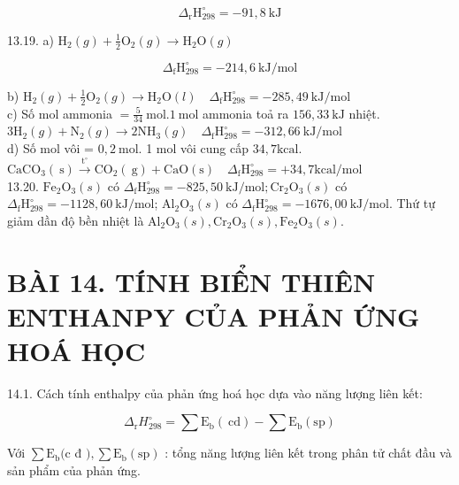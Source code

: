 \documentclass[10pt]{article}
\begin{document}
$$
\Delta_{\mathrm{r}} \mathrm{H}_{298}^{\circ}=-91,8 \mathrm{~kJ}
$$

13.19. a) $\mathrm{H}_{2}(g)+\frac{1}{2} \mathrm{O}_{2}(g) \rightarrow \mathrm{H}_{2} \mathrm{O}(g)$

$$
\Delta_{\mathrm{f}} \mathrm{H}_{298}^{\circ}=-214,6 \mathrm{~kJ} / \mathrm{mol}
$$

b) $\mathrm{H}_{2}(g)+\frac{1}{2} \mathrm{O}_{2}(g) \rightarrow \mathrm{H}_{2} \mathrm{O}(l) \quad \Delta_{\mathrm{f}} \mathrm{H}_{298}^{\circ}=-285,49 \mathrm{~kJ} / \mathrm{mol}$\\
c) Số mol ammonia $=\frac{5}{34} \mathrm{~mol} .1 \mathrm{~mol}$ ammonia toả ra $156,33 \mathrm{~kJ}$ nhiệt.\\
$3 \mathrm{H}_{2}(g)+\mathrm{N}_{2}(g) \rightarrow 2 \mathrm{NH}_{3}(g) \quad \Delta_{\mathrm{f}} \mathrm{H}_{298}^{\circ}=-312,66 \mathrm{~kJ} / \mathrm{mol}$\\
d) Số mol vôi = $0,2 \mathrm{~mol}$. 1 mol vôi cung cấp $34,7 \mathrm{kcal}$.\\
$\mathrm{CaCO}_{3}(\mathrm{~s}) \xrightarrow{\mathrm{t}^{\circ}} \mathrm{CO}_{2}(\mathrm{~g})+\mathrm{CaO}(\mathrm{s}) \quad \Delta_{\mathrm{f}} \mathrm{H}_{298}^{\circ}=+34,7 \mathrm{kcal} / \mathrm{mol}$\\
13.20. $\mathrm{Fe}_{2} \mathrm{O}_{3}(s)$ có $\Delta_{\mathrm{f}} \mathrm{H}_{298}^{\circ}=-825,50 \mathrm{~kJ} / \mathrm{mol} ; \mathrm{Cr}_{2} \mathrm{O}_{3}(s)$ có $\Delta_{\mathrm{f}} \mathrm{H}_{298}^{\circ}=-1128,60 \mathrm{~kJ} / \mathrm{mol}$; $\mathrm{Al}_{2} \mathrm{O}_{3}(s)$ có $\Delta_{\mathrm{f}} \mathrm{H}_{298}^{\circ}=-1676,00 \mathrm{~kJ} / \mathrm{mol}$. Thứ tự giảm dần độ bền nhiệt là $\mathrm{Al}_{2} \mathrm{O}_{3}(s), \mathrm{Cr}_{2} \mathrm{O}_{3}(s), \mathrm{Fe}_{2} \mathrm{O}_{3}(s)$.

\section*{BÀI 14. TÍNH BIỂN THIÊN ENTHANPY CỦA PHẢN ỨNG HOÁ HỌC}
14.1. Cách tính enthalpy của phản ứng hoá học dựa vào năng lượng liên kết:

$$
\Delta_{\mathrm{r}} H_{298}^{\circ}=\sum \mathrm{E}_{\mathrm{b}}(\mathrm{~cd})-\sum \mathrm{E}_{\mathrm{b}}(\mathrm{sp})
$$

Với $\sum \mathrm{E}_{\mathrm{b}}(\mathrm{c}$ đ $), \sum \mathrm{E}_{\mathrm{b}}(\mathrm{sp})$ : tổng năng lượng liên kết trong phân tử chất đầu và sản phẩm của phản ứng.
\end{document}
